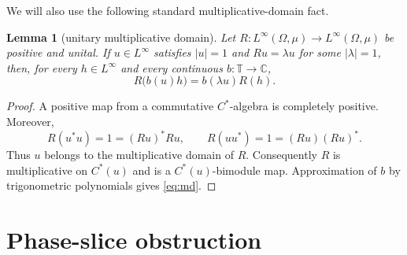 \documentclass[11pt]{article}
\newtheorem{lemma}[theorem]{Lemma}
\newcommand{\Torus}{\mathbb T}
\begin{document}
We will also use the following standard multiplicative-domain fact.

\begin{lemma}[unitary multiplicative domain]\label{lem:md}
Let $R:L^\infty(\Omega,\mu)\to L^\infty(\Omega,\mu)$ be positive and
unital.  If $u\in L^\infty$ satisfies $|u|=1$ and $Ru=\lambda u$ for some
$|\lambda|=1$, then, for every $h\in L^\infty$ and every continuous
$b:\Torus\to\mathbb C$,
\begin{equation}\label{eq:md}
 R\bigl(b(u)h\bigr)=b(\lambda u)R(h).
\end{equation}
\end{lemma}

\begin{proof}
A positive map from a commutative $C^*$-algebra is completely positive.
Moreover,
\[
 R(u^*u)=1=(Ru)^*Ru,
 \qquad
 R(uu^*)=1=(Ru)(Ru)^*.
\]
Thus $u$ belongs to the multiplicative domain of $R$.  Consequently $R$ is
multiplicative on $C^*(u)$ and is a $C^*(u)$-bimodule map.  Approximation of
$b$ by trigonometric polynomials gives \eqref{eq:md}.
\end{proof}

\section{Phase-slice obstruction}
\end{document}
